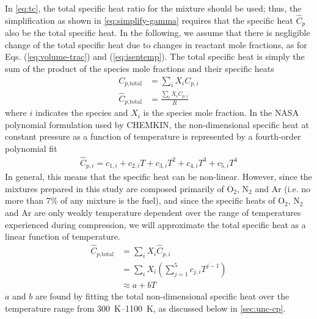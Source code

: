 \documentclass[../main.tex]{subfiles}
\begin{document}
In \cref{eq:tc}, the total specific heat ratio for the mixture
should be used; thus, the simplification as shown in \cref{eq:simplify-gamma}
requires that the specific heat $\hat{C}_p$ also be the total specific
heat. In the following, we assume that there is negligible
change of the total specific heat due to changes in reactant
mole fractions, as for Eqs. (\ref{eq:volume-trac}) and (\ref{eq:isentemp}).
The total specific heat is simply the sum of the product of
the species mole fractions and their specific heats
%
\begin{subequations}
\label{eq:cp}
\begin{align}
C_{p\text{,total}} &= \sum_i X_i C_{p,i} \\
\hat{C}_{p\text{,total}} &= \frac{\sum_i X_i C_{p,i}}{R}
\end{align}
\end{subequations}
%
where $i$ indicates the species and $X_i$ is the species mole fraction.
In the NASA polynomial formulation used by CHEMKIN, the non-dimensional specific
heat at constant pressure as a function of temperature is represented by a
fourth-order polynomial fit
%
\begin{align}
\hat{C}_{p,i} = c_{1,i} + c_{2,i} T + c_{3,i} T^2 + c_{4,i} T^3 + c_{5,i} T^4
\end{align}
%
In general, this means that the specific heat can be non-linear. However,
since the mixtures prepared in this study are composed primarily of
O$_2$, N$_2$ and Ar (i.e. no more than 7\% of any mixture is the
fuel), and since the specific heats of O$_2$, N$_2$ and Ar are only weakly
temperature dependent over the range of temperatures experienced during
compression, we will approximate the total specific heat as a linear function
of temperature.
%
\begin{equation}%
\label{eq:cp-total}
\begin{split}
\hat{C}_{p\text{,total}} &= \sum_i X_i \hat{C}_{p,i} \\
&= \sum_i X_i \left( \sum_{j=1}^5 c_{j,i} T^{j-1} \right) \\
&\approx a + b T
\end{split}
\end{equation}
%
$a$ and $b$ are found by fitting the total non-dimensional specific heat
over the temperature range from \SIrange{300}{1100}{\kelvin}, as discussed below in
\cref{sec:unc-cp}.
\end{document}
